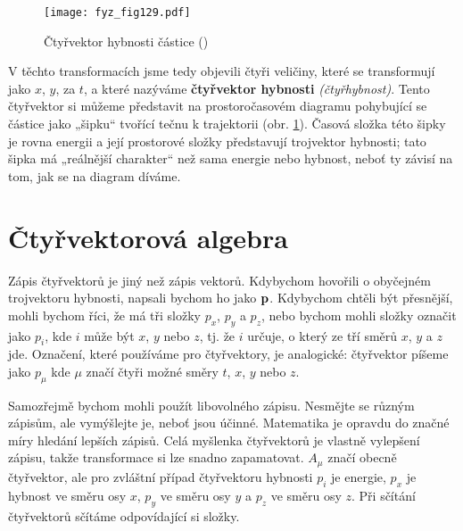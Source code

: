     \begin{figure}[ht!]  %
      \centering
      \texttt{[image: fyz\_fig129.pdf]}
      \caption{Čtyřvektor hybnosti částice (\cite[s.~244]{Feynman01})}
      \label{fyz:fig129}
    \end{figure}

    V těchto transformacích jsme tedy objevili čtyři veličiny, které se transformují jako \(x\),
    \(y\), za \(t\), a které nazýváme \textbf{čtyřvektor hybnosti} \emph{(čtyřhybnost)}. Tento
    čtyřvektor si můžeme představit na prostoročasovém diagramu pohybující se částice jako „šipku“
    tvořící tečnu k trajektorii (obr. \ref{fyz:fig129}). Časová složka této šipky je rovna energii a
    její prostorové složky představují trojvektor hybnosti; tato šipka má „reálnější charakter“ než
    sama energie nebo hybnost, neboť ty závisí na tom, jak se na diagram díváme.
    
  \section{Čtyřvektorová algebra}\label{fyz:IchapXVIIsecV}
    Zápis čtyřvektorů je jiný než zápis vektorů. Kdybychom hovořili o obyčejném trojvektoru hybnosti,
    napsali bychom ho jako \(\mathbf{p}\). Kdybychom chtěli být přesnější, mohli bychom říci, že má tři
    složky \(p_x\), \(p_y\) a \(p_z\), nebo bychom mohli složky označit jako \(p_i\), kde \(i\) může
    být \(x\), \(y\) nebo \(z\), tj. že \(i\) určuje, o který ze tří směrů \(x\), \(y\) a \(z\) jde.
    Označení, které používáme pro čtyřvektory, je analogické: čtyřvektor píšeme jako \(p_\mu\) kde
    \(\mu\) značí čtyři možné směry \(t\), \(x\), \(y\) nebo \(z\).

    Samozřejmě bychom mohli použít libovolného zápisu. Nesmějte se různým zápisům, ale vymýšlejte
    je, neboť jsou účinné. Matematika je opravdu do značné míry hledání lepších zápisů. Celá
    myšlenka čtyřvektorů je vlastně vylepšení zápisu, takže transformace si lze snadno zapamatovat.
    \(A_\mu\) značí obecně čtyřvektor, ale pro zvláštní případ čtyřvektoru hybnosti \(p_i\) je
    energie, \(p_x\) je hybnost ve směru osy \(x\), \(p_y\) ve směru osy \(y\) a \(p_z\) ve směru
    osy \(z\). Při sčítání čtyřvektorů sčítáme odpovídající si složky.

